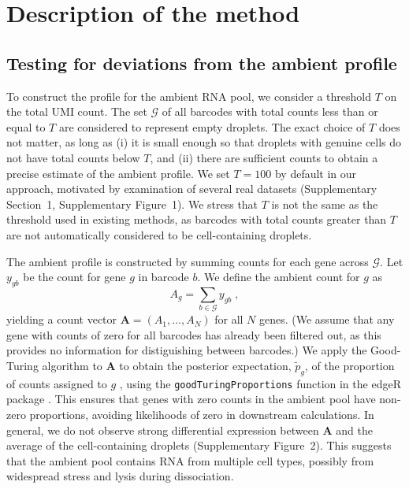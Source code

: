 \documentclass[10pt,letterpaper]{article}
\newcommand{\code}[1]{\texttt{#1}}
\newcommand{\suppfignegative}{1}
\newcommand{\suppfigambientma}{2}
\newcommand{\suppsecthreshold}{1}
\begin{document}
\section*{Description of the method}

\subsection*{Testing for deviations from the ambient profile}
To construct the profile for the ambient RNA pool, we consider a threshold $T$ on the total UMI count.
The set $\mathcal{G}$ of all barcodes with total counts less than or equal to $T$ are considered to represent empty droplets.
The exact choice of $T$ does not matter, as long as (i) it is small enough so that droplets with genuine cells do not have total counts below $T$,
and (ii) there are sufficient counts to obtain a precise estimate of the ambient profile.
We set $T=100$ by default in our approach, motivated by examination of several real datasets (Supplementary Section~\suppsecthreshold{}, Supplementary Figure~\suppfignegative{}).
We stress that $T$ is not the same as the threshold used in existing methods, as barcodes with total counts greater than $T$ are not automatically considered to be cell-containing droplets.

The ambient profile is constructed by summing counts for each gene across $\mathcal{G}$.
Let $y_{gb}$ be the count for gene $g$ in barcode $b$.
We define the ambient count for $g$ as 
\[
    A_{g} = \sum_{b \in \mathcal{G}} y_{gb} \;,
\]
yielding a count vector $\mathbf{A} = (A_1, \dots, A_N)$ for all $N$ genes.
(We assume that any gene with counts of zero for all barcodes has already been filtered out, as this provides no information for distiguishing between barcodes.)
We apply the Good-Turing algorithm to $\mathbf{A}$ to obtain the posterior expectation, $\tilde{p}_g$, of the proportion of counts assigned to $g$ \cite{gale1995good}, using the \code{goodTuringProportions} function in the \textsf{edgeR} package \cite{robinson2010edgeR}.
This ensures that genes with zero counts in the ambient pool have non-zero proportions, avoiding likelihoods of zero in downstream calculations.
In general, we do not observe strong differential expression between $\mathbf{A}$ and the average of the cell-containing droplets (Supplementary Figure~\suppfigambientma{}).
This suggests that the ambient pool contains RNA from multiple cell types, possibly from widespread stress and lysis during dissociation.
\end{document}
